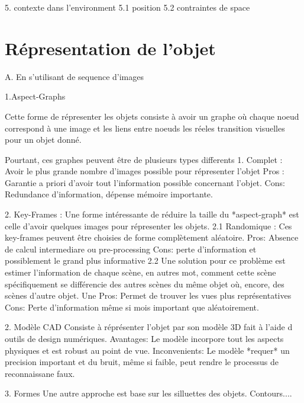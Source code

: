 5. contexte dans l'environment
5.1 position
5.2 contraintes de space

\section{Répresentation de l'objet}

A.  En s'utilisant de sequence d'images

1.Aspect-Graphs

Cette forme de répresenter les objets consiste à avoir un graphe où chaque noeud correspond à une image et les liens entre noeuds les réeles transition visuelles pour un objet donné.

Pourtant, ces graphes peuvent être de plusieurs types differents 
1. Complet : Avoir le plus grande nombre d'images possible pour répresenter l'objet
Pros : Garantie a priori d'avoir tout l'information possible concernant l'objet.
Cons: Redundance d'information, dépense mémoire importante.

2. Key-Frames : Une forme intéressante de réduire la taille du *aspect-graph* est celle d'avoir quelques images pour répresenter les objets.
2.1 Randomique : Ces key-frames peuvent être choisies de forme complètement aléatoire. 
Pros: Absence de calcul intermediare ou pre-processing
Cons: perte d'information et possiblement le grand plus informative
2.2 Une solution pour ce problème est estimer l'information de chaque scène, en autres mot, comment cette scène spécifiquement se différencie des autres scènes du même objet où, encore, des scènes d'autre objet. Une 
Pros: Permet de trouver les vues plus représentatives  
Cons: Perte d'information même si mois important que aléatoirement. 

2. Modèle CAD
Consiste à réprésenter l'objet par son modèle 3D fait à l'aide d outils de design numériques.
Avantages: Le modèle incorpore tout les aspects physiques et est robust au point de vue.
Inconvenients: Le modèle *requer* un precision important et du bruit, même si faible, peut rendre le processus de reconnaissane faux.


3. Formes 
Une autre approche est base sur les silluettes des objets. Contours....
